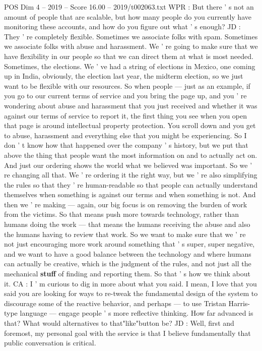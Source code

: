 \begin{textsample}{POS Dim 4 – 2019 – Score 16.00 – 2019/t002063.txt}
WPR : But there ' s not an amount of people that are scalable, but how many people do you currently have monitoring these accounts, and how do you figure out what ' s enough?
JD : They ' re completely flexible.
Sometimes we associate folks with spam.
Sometimes we associate folks with abuse and harassment.
We ' re going to make sure that we have flexibility in our people so that we can direct them at what is most needed.
Sometimes, the elections.
We ' ve had a string of elections in Mexico, one coming up in India, obviously, the election last year, the midterm election, so we just want to be flexible with our resources.
So when people — just as an example, if you go to our current terms of service and you bring the page up, and you ' re wondering about abuse and harassment that you just received and whether it was against our terms of service to report it, the first thing you see when you open that page is around intellectual property protection.
You scroll down and you get to abuse, harassment and everything else that you might be experiencing.
So I don ' t know how that happened over the company ' s history, but we put that above the thing that people want the most information on and to actually act on.
And just our ordering shows the world what we believed was important.
So we ' re changing all that.
We ' re ordering it the right way, but we ' re also simplifying the rules so that they ' re human-readable so that people can actually understand themselves when something is against our terms and when something is not.
And then we ' re making — again, our big focus is on removing the burden of work from the victims.
So that means push more towards technology, rather than humans doing the work — that means the humans receiving the abuse and also the humans having to review that work.
So we want to make sure that we ' re not just encouraging more work around something that ' s super, super negative, and we want to have a good balance between the technology and where humans can actually be creative, which is the judgment of the rules, and not just all the mechanical \textbf{stuff} of finding and reporting them.
So that ' s how we think about it.
CA : I ' m curious to dig in more about what you said.
I mean, I love that you said you are looking for ways to re-tweak the fundamental design of the system to discourage some of the reactive behavior, and perhaps — to use Tristan Harris-type language — engage people ' s more reflective thinking.
How far advanced is that?
What would alternatives to that"like"button be?
JD : Well, first and foremost, my personal goal with the service is that I believe fundamentally that public conversation is critical.

\end{textsample}
